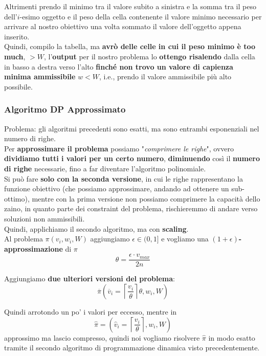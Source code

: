 Altrimenti prendo il minimo tra il valore subito a sinistra e la somma tra il peso dell'$i$-esimo oggetto e il peso della cella contenente il valore minimo necessario per arrivare al nostro obiettivo una volta sommato il valore dell'oggetto appena inserito.\\

Quindi, compilo la tabella, ma \textbf{avrò delle celle in cui il peso minimo è too much}, $> W$, l'\textbf{output} per il nostro problema lo \textbf{ottengo risalendo} dalla cella in basso a destra verso l'alto \textbf{finché non trovo un valore di capienza minima ammissibile} $w < W$, i.e., prendo il valore ammissibile più alto possibile.\\

\newpage

\subsubsection{Algoritmo DP Approssimato}

Problema: gli algoritmi precedenti sono esatti, ma sono entrambi esponenziali nel numero di righe.\\

Per \textbf{approssimare il problema} possiamo "\textit{comprimere le righe}", ovvero \textbf{dividiamo tutti i valori per un certo numero}, \textbf{diminuendo} così il \textbf{numero di righe} necessarie, fino a far diventare l'algoritmo polinomiale.\\

Si può fare \textbf{solo con la seconda versione}, in cui le righe rappresentano la funzione obiettivo (che possiamo approssimare, andando ad ottenere un sub-ottimo), mentre con la prima versione non possiamo comprimere la capacità dello zaino, in quanto parte dei constraint del problema, rischieremmo di andare verso soluzioni non ammissibili.\\

Quindi, applichiamo il secondo algoritmo, ma con \textbf{scaling}.\\

Al problema $\pi (v_i, w_i, W)$ aggiungiamo $\epsilon \in (0,1]$ e vogliamo una \textbf{$(1+\epsilon)$-approssimazione} di $\pi$
$$ \theta = \frac{\epsilon \cdot v_{max}}{2n}$$

Aggiungiamo \textbf{due ulteriori versioni del problema}: 
$$ \overline{\pi} \left(\overline{v}_i = \left\lceil \frac{v_i}{\theta} \right\rceil \theta, w_i, W\right) $$

Quindi arrotondo un po' i valori per eccesso, mentre in 
$$ \hat \pi = \left( \hat v_i = \left\lceil \frac{v_i}{\theta} \right\rceil, w_i, W \right)$$
approssimo ma lascio compresso, quindi noi vogliamo risolvere $\hat \pi$ in modo esatto tramite il secondo algoritmo di programmazione dinamica visto precedentemente.\\


